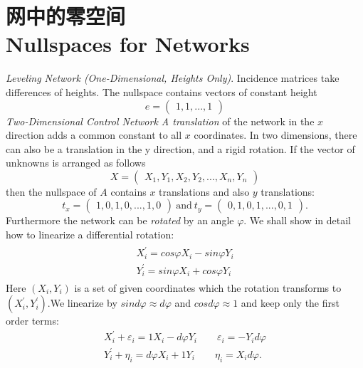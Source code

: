 \section[网中的零空间]{网中的零空间\\Nullspaces for Networks}	
\par \noindent
\emph{Leveling Network (One-Dimensional, Heights Only)}. Incidence matrices take differences of heights. The nullspace contains vectors of constant height
\begin{equation}
	e =
	\begin{pmatrix}
		1,1,...,1
	\end{pmatrix}
\end{equation}
\emph{Two-Dimensional Control Network A translation} of the network in the $x$ direction adds a common constant to all $x$ coordinates. In two dimensions, there can also be a translation in the y direction, and a rigid rotation. If the vector of unknowns is arranged as follows
\begin{equation}
	X =
	\begin{pmatrix}
		X_1,Y_1,X_2,Y_2,...,X_n,Y_n
	\end{pmatrix}
\end{equation}
then the nullspace of $A$ contains $x$ translations and also $y$ translations:
\begin{equation}
	t_x =
	\begin{pmatrix}
		1,0,1,0,...,1,0
	\end{pmatrix}
	\  \text{and}\   t_y =
	\begin{pmatrix}
		0,1,0,1,...,0,1
	\end{pmatrix}.
\end{equation}
Furthermore the network can be \emph{rotated} by an angle $\varphi$. We shall show in detail how to linearize a differential rotation:
\begin{align}
	\begin{split}
		X_{i}^{'} = cos{\varphi}X_i - sin{\varphi}Y_i \\
		Y_{i}^{'} = sin{\varphi}X_i + cos{\varphi}Y_i
	\end{split}
\end{align}
Here $(X_{i},Y_{i})$ is a set of given coordinates which the rotation transforms to $(X_{i}^{'},{Y_{i}^{'}})$.We linearize by $sin{d\varphi} \approx d\varphi$ and $cos{d\varphi} \approx 1$ and keep only the first order terms:
\begin{align*}
	X_{i}^{'} + \varepsilon_i = 1 X_i - d\varphi Y_i\qquad  \varepsilon_i = -Y_i d\varphi   \\
	Y_{i}^{'}  + \eta_i = d\varphi X_i + 1 Y_i\qquad
	\eta_i = X_i d\varphi.
\end{align*}

